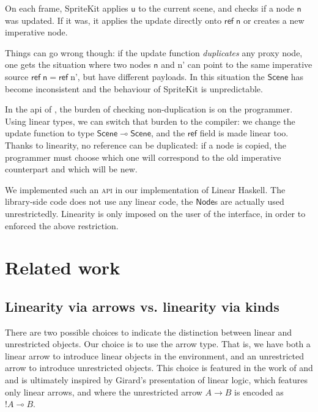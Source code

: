 \documentclass[acmsmall,screen]{acmart}\settopmatter{}
\newcommand{\Conid}[1]{\mathit{#1}}
\newcommand{\Varid}[1]{\mathit{#1}}
\renewcommand\Varid[1]{\mathord{\textsf{#1}}}
\renewcommand\Conid[1]{\mathord{\textsf{#1}}}
\newcommand\HaskeLL{Linear Haskell\xspace{}}
\begin{document}
On each frame, SpriteKit applies \ensuremath{\Varid{u}} to the current scene, and checks
if a node \ensuremath{\Varid{n}} was updated. If it was, it applies the update directly
onto \ensuremath{\Varid{ref}\;\Varid{n}} or creates a new imperative node.

Things can go wrong though: if the update function {\em duplicates}
any proxy node, one gets the situation where two nodes \ensuremath{\Varid{n}} and
\ensuremath{\Varid{n'}} can point to the same imperative source \ensuremath{\Varid{ref}\;\Varid{n}\mathrel{=}\Varid{ref}\;\Varid{n'}}, but
have different payloads. In this situation the \ensuremath{\Conid{Scene}} has become
inconsistent and the behaviour of SpriteKit is unpredictable.

In the {\sc api} of \citet{chakravarty_spritekit_2017}, the burden of checking
non-duplication is on the programmer.  Using linear types, we can
switch that burden to the compiler: we change the update function to
type \ensuremath{\Conid{Scene}\mathbin{⊸}\Conid{Scene}}, and the \ensuremath{\Varid{ref}} field is made linear too.  Thanks
to linearity, no reference can be duplicated: if a node is copied, the
programmer must choose which one will correspond to the old imperative
counterpart and which will be new.

We implemented such an \textsc{api} in our implementation of
\HaskeLL{}. The library-side code does not use any linear code, the
\ensuremath{\Conid{Node}}s are actually used unrestrictedly. Linearity is only imposed on
the user of the interface, in order to enforced the above restriction.

\section{Related work}
\label{sec:related}
\subsection{Linearity via arrows vs. linearity via kinds}
\label{sec:lin-arrow}

There are two possible choices to indicate the distinction between
linear and unrestricted objects.  Our choice is to use the arrow
type. That is, we have both a linear arrow to introduce linear objects
in the environment, and an unrestricted arrow to introduce
unrestricted objects. This choice is featured in the work of
\citet{mcbride_rig_2016} and \citet{ghica_bounded_2014} and is
ultimately inspired by Girard's presentation of linear logic, which
features only linear arrows, and where the unrestricted arrow $A → B$
is encoded as $!A ⊸ B$.
\end{document}
